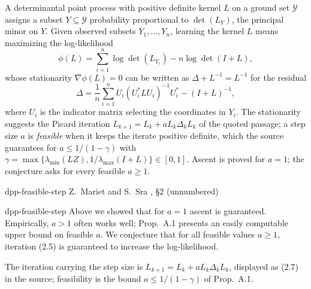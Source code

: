 

\begin{cxcredits}
\end{cxcredits}

\begin{cxcontext}
A determinantal point process with positive definite kernel $L$ on a ground set $\mathcal Y$ assigns a subset $Y\subseteq\mathcal Y$ probability proportional to $\det(L_Y)$, the principal minor on $Y$.  Given observed subsets $Y_1,\ldots,Y_n$, learning the kernel $L$ means maximizing the log-likelihood
\[
\phi(L)=\sum_{i=1}^n\log\det(L_{Y_i})-n\log\det(I+L),
\]
whose stationarity $\nabla\phi(L)=0$ can be written as $\Delta+L^{-1}=L^{-1}$ for the residual
\[
\Delta=\frac1n\sum_{i=1}^nU_i(U_i^*LU_i)^{-1}U_i^*-(I+L)^{-1},
\]
where $U_i$ is the indicator matrix selecting the coordinates in $Y_i$.  The stationarity suggests the Picard iteration $L_{k+1}=L_k+aL_k\Delta_kL_k$ of the quoted passage; a step size $a$ is \emph{feasible} when it keeps the iterate positive definite, which the source guarantees for $a\le1/(1-\gamma)$ with $\gamma=\max\{\lambda_{\min}(LZ),1/\lambda_{\max}(I+L)\}\in[0,1]$.  Ascent is proved for $a=1$; the conjecture asks for every feasible $a\ge1$.
\end{cxcontext}


\begin{cxsource}{dpp-feasible-step}
Z.~Mariet and S.~Sra \citeyearpar{MarietSra2015}, \S2 (unnumbered)
\end{cxsource}

\begin{cxstatement}{dpp-feasible-step}
Above we showed that for $a=1$ ascent is guaranteed.  Empirically, $a>1$ often works well; Prop.~A.1 presents an easily computable upper bound on feasible $a$.  We conjecture that for all feasible values $a\ge1$, iteration (2.5) is guaranteed to increase the log-likelihood.

The iteration carrying the step size is $L_{k+1}=L_k+aL_k\Delta_kL_k$, displayed as (2.7) in the source; feasibility is the bound $a\le1/(1-\gamma)$ of Prop.~A.1.
\end{cxstatement}

